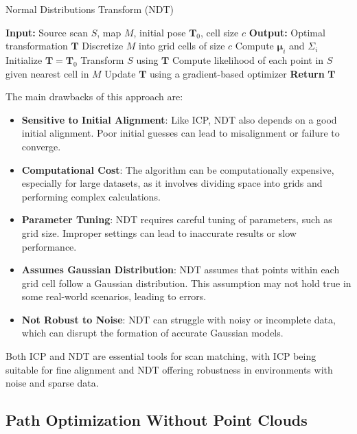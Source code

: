 \begin{algorithm}[H]
\caption{Normal Distributions Transform (NDT)}
\begin{algorithmic}[1]
\State \textbf{Input:} Source scan \( S \), map \( M \), initial pose \( \mathbf{T}_0 \), cell size \( c \)
\State \textbf{Output:} Optimal transformation \( \mathbf{T} \)
\State Discretize \( M \) into grid cells of size \( c \)
    \State Compute \( \boldsymbol{\mu}_i \) and \( \Sigma_i \)
\EndFor
\State Initialize \( \mathbf{T} = \mathbf{T}_0 \)
\Repeat
    \State Transform \( S \) using \( \mathbf{T} \)
    \State Compute likelihood of each point in \( S \) given nearest cell in \( M \)
    \State Update \( \mathbf{T} \) using a gradient-based optimizer
\State \textbf{Return} \( \mathbf{T} \)
\end{algorithmic}
\end{algorithm}

The main drawbacks of this approach are:
\begin{itemize}
    \item \textbf{Sensitive to Initial Alignment}: Like ICP, NDT also depends on a good initial alignment. Poor initial guesses can lead to misalignment or failure to converge.
    \item \textbf{Computational Cost}: The algorithm can be computationally expensive, especially for large datasets, as it involves dividing space into grids and performing complex calculations.
    \item \textbf{Parameter Tuning}: NDT requires careful tuning of parameters, such as grid size. Improper settings can lead to inaccurate results or slow performance.
    \item \textbf{Assumes Gaussian Distribution}: NDT assumes that points within each grid cell follow a Gaussian distribution. This assumption may not hold true in some real-world scenarios, leading to errors.
    \item \textbf{Not Robust to Noise}: NDT can struggle with noisy or incomplete data, which can disrupt the formation of accurate Gaussian models.
\end{itemize}

Both ICP and NDT are essential tools for scan matching, with ICP being suitable for fine alignment and NDT offering robustness in environments with noise and sparse data.

\subsection*{Path Optimization Without Point Clouds}

